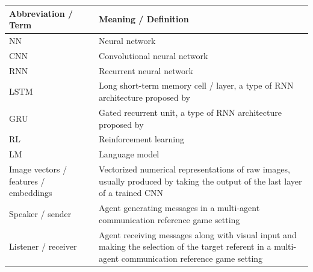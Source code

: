 
\begin{table}[]
	\centering
	\begin{tabularx}{\textwidth}{|X|X|}
		\hline
		\textbf{Abbreviation / Term} & \textbf{Meaning / Definition}                                                                                                                          \\ \hline
		NN                           & Neural network                                                                                                                                         \\ \hline
		CNN                          & Convolutional neural network                                                                                                                           \\ \hline
		RNN                          & Recurrent neural network                                                                                                                               \\ \hline
		LSTM                         & Long short-term memory cell / layer, a type of RNN architecture proposed by \cite{hochreiter1997long}                                                                                                                         \\ \hline
		GRU                   & Gated recurrent unit, a type of RNN architecture proposed by \cite{cho2014properties}                            \\ \hline
		RL                           & Reinforcement learning                                                                                                                                 \\ \hline
		LM 						& Language model \parencite{jurafsky2000speech} \\ \hline
		Image vectors / features / embeddings & Vectorized numerical representations of raw images, usually produced by taking the output of the last layer of a trained CNN \\ \hline
		Speaker / sender             & Agent generating messages in a multi-agent communication reference game setting                                                                        \\ \hline
		Listener / receiver          & Agent receiving messages along with visual input and making the selection of the target referent in a multi-agent communication reference game setting \\ \hline
		

\end{tabularx}
\end{table}
